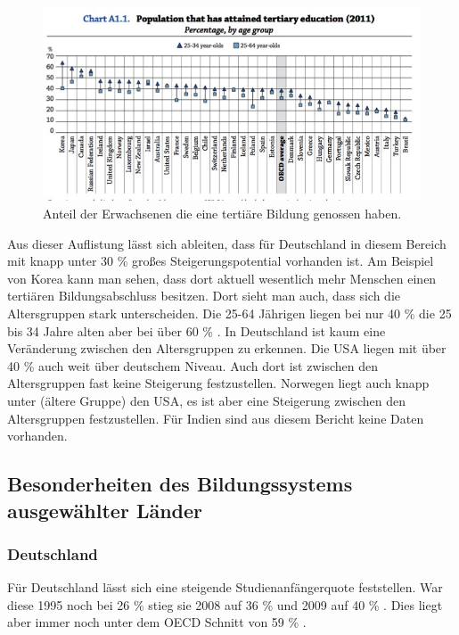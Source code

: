 \begin{figure}[H]
\includegraphics[width=15cm]{./images/tertiary.jpg}
\center
\caption{Anteil der Erwachsenen die eine tertiäre Bildung genossen haben. \cite[26]{oecd5} }
\end{figure}
Aus dieser Auflistung lässt sich ableiten, dass für Deutschland in diesem Bereich mit knapp unter 30 \% großes Steigerungspotential vorhanden ist.
Am Beispiel von Korea kann man sehen, dass dort aktuell wesentlich mehr Menschen einen tertiären Bildungsabschluss besitzen. Dort sieht man auch, dass sich die Altersgruppen stark unterscheiden. Die 25-64 Jährigen liegen bei nur 40 \% die 25 bis 34 Jahre alten aber bei über 60 \% . In Deutschland ist kaum eine Veränderung zwischen den Altersgruppen zu erkennen.
Die USA liegen mit über 40 \% auch weit über deutschem Niveau. Auch dort ist zwischen den Altersgruppen fast keine Steigerung festzustellen.
Norwegen liegt auch knapp unter (ältere Gruppe) den USA, es ist aber eine Steigerung zwischen den Altersgruppen festzustellen.
Für Indien sind aus diesem Bericht keine Daten vorhanden.

\subsection{Besonderheiten des Bildungssystems ausgewählter Länder}
\subsubsection*{Deutschland}
Für Deutschland lässt sich eine steigende Studienanfängerquote feststellen. War diese 1995 noch bei 26 \%  stieg sie 2008 auf 36 \%  und 2009 auf 40 \% . Dies liegt aber immer noch unter dem OECD Schnitt von 59 \% .

